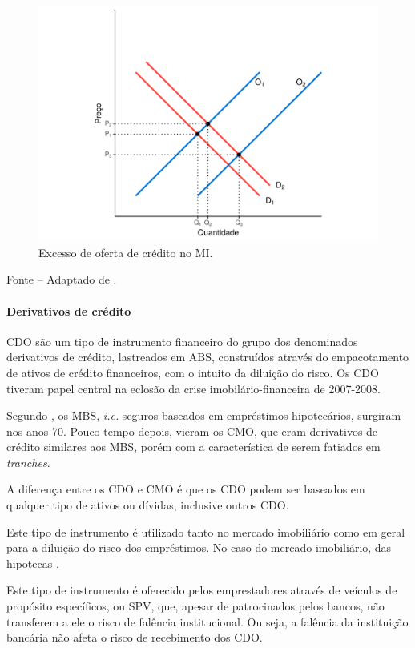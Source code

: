 \documentclass[
	12pt,				%
	oneside,			%
	a4paper,			%
	chapter=TITLE,		%
	section=TITLE,		%
	english,			%
	brazil				%
	]{abntex2}
\newcommand{\bcenter}{\begin{center}}
\newcommand{\ecenter}{\end{center}}
\begin{document}
\begin{refsection}
\begin{figure}[H]
{\centering \includegraphics[width=0.7\linewidth]{images/excessHousingFinanceSupply-1} 

}

\caption{Excesso de oferta de crédito no \gls{MI}.}\label{fig:excessHousingFinanceSupply}
\end{figure}
\bcenter

\small Fonte -- Adaptado de \textcite[p.~1205]{levitin2012}.
\ecenter

\hypertarget{derivativos-de-cruxe9dito}{%
\paragraph{Derivativos de crédito}\label{derivativos-de-cruxe9dito}}

\gls{CDO} são um tipo de instrumento financeiro do grupo dos denominados
derivativos de crédito, lastreados em \gls{ABS}, construídos através do
empacotamento de ativos de crédito financeiros, com o intuito da diluição do
risco. Os \gls{CDO} tiveram papel central na eclosão da crise
imobilário-financeira de 2007-2008.

Segundo \textcite{watts}, os \gls{MBS}, \emph{i.e.} seguros baseados em empréstimos hipotecários,
surgiram nos anos 70. Pouco tempo depois, vieram os \gls{CMO}, que eram
derivativos de crédito similares aos \gls{MBS}, porém com a característica de
serem fatiados em \emph{tranches}.

A diferença entre os \gls{CDO} e \gls{CMO} é que os \gls{CDO} podem ser baseados
em qualquer tipo de ativos ou dívidas, inclusive outros \gls{CDO}.

Este tipo de instrumento é utilizado tanto no mercado imobiliário como em geral
para a diluição do risco dos empréstimos. No caso do mercado imobiliário, das
hipotecas \autocite[2]{watts}.

Este tipo de instrumento é oferecido pelos emprestadores através de veículos de
propósito específicos, ou \gls{SPV}, que, apesar de patrocinados pelos bancos,
não transferem a ele o risco de falência institucional. Ou seja, a falência da
instituição bancária não afeta o risco de recebimento dos \gls{CDO}.
\begin{figure}[H]


\end{figure}
\end{refsection}
\end{document}
